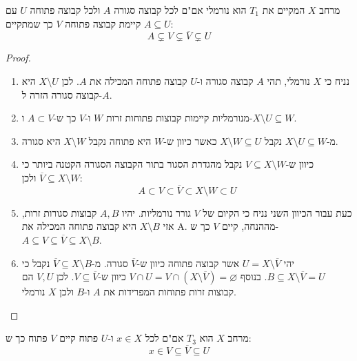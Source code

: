 \documentclass{tstextbook}
\begin{document}
\begin{proposition}
מרחב \(X\) המקיים את \(T_{1}\) הוא נורמלי אם"ם לכל קבוצה סגורה \(A\) ולכל קבוצה פתוחה \(U\) עם \(A\subseteq U\) קיימת קבוצה פתוחה \(V\) כך שמתקיים:
$$A\subsetneq V\subsetneq \overline{V} \subsetneq U$$

\end{proposition}
\begin{proof}
  \begin{enumerate}
    \item נניח כי \(X\) נורמלי, תהי \(A\) קבוצה סגורה ו-\(U\) קבוצה פתוחה המכילה את \(A\). לכן \(X\setminus U\) היא קבוצה סגורה הזרה ל-\(A\). 


    \item מנורמליות קיימות קבוצות פתוחות זרות \(W\) ו-\(V\) כך ש-\(A \subset V\) ו-\(X \setminus U \subseteq W\). 


    \item מ-\(X\setminus U \subseteq W\) נקבל \(X\setminus W\subseteq U\) כאשר כיוון ש-\(W\) היא פתוחה נקבל \(X\setminus W\) היא סגורה. 


    \item כיוון ש-\(V\subseteq X\setminus W\) נקבל מהגדרת הסגור בתור הקבוצה הסגורה הקטנה ביותר כי \(\overline{V}\subseteq X\setminus W\) ולכן: 
$${ A}\subset V\subset{\overline{{V}}}\subset X\setminus W\subset U$$


    \item כעת עבור הכיוון השני נניח כי הקיום של \(V\) גורר נורמליות. יהיו \(A,B\) קבוצות סגורות זרות, אזי \(X\setminus B\) היא קבוצה פתוחה המכילה את A. מההנחה, קיים \(V\) כך ש-\(A\subseteq V\subseteq \overline{ V}\subseteq X\setminus B\).  


    \item יהי \(U=X \setminus \overline{V}\) אשר קבוצה פתוחה כיוון ש-\(\overline{ V}\) סגורה. מ-\(\overline{V}\subseteq X \setminus B\) נקבל כי \(B\subseteq X\setminus \overline{ V}=U\). בנוסף \(V\cap U = V\cap(X \setminus \overline{ V})=\varnothing\) כיוון ש-\(V\subseteq \overline{ V}\). לכן \(V,U\) הם קבוצות זרות פתוחות המפרידות את \(A\) ו-\(B\) ולכן \(X\) נורמלי. 


  \end{enumerate}
\end{proof}
\begin{proposition}
מרחב \(X\) הוא \(T_{3}\) אם"ם לכל \(x \in X\) ו-\(U\) פתוח קיים \(V\) פתוח כך ש:
$$x \in V\subseteq \overline{V} \subseteq U$$

\end{proposition}
\end{document}
